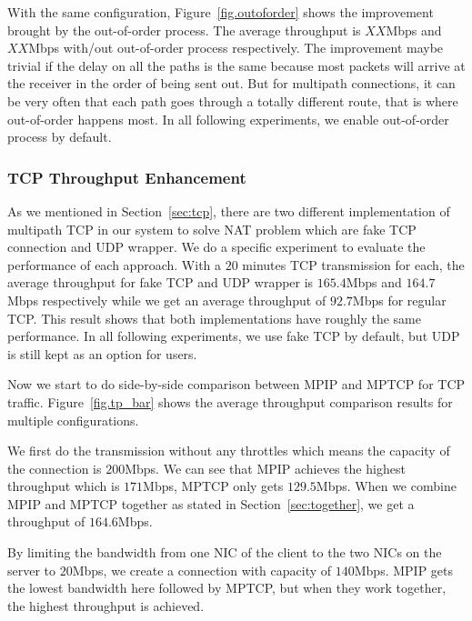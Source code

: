 With the same configuration, Figure~\ref{fig.outoforder} shows the improvement brought by the out-of-order process. The average throughput is $XX$Mbps and $XX$Mbps with/out out-of-order process respectively. The improvement maybe trivial if the delay on all the paths is the same because most packets will arrive at the receiver in the order of being sent out. But for multipath connections, it can be very often that each path goes through a totally different route, that is where out-of-order happens most. In all following experiments, we enable out-of-order process by default.

\subsubsection{TCP Throughput Enhancement}
\label{sec:tcptp}

As we mentioned in Section~\ref{sec:tcp}, there are two different implementation of multipath TCP in our system to solve NAT problem which are fake TCP connection and UDP wrapper. We do a specific experiment to evaluate the performance of each approach. With a $20$ minutes TCP transmission for each, the average throughput for fake TCP and UDP wrapper is $165.4$Mbps and $164.7$Mbps respectively while we get an average throughput of $92.7$Mbps for regular TCP. This result shows that both implementations have roughly the same performance. In all following experiments, we use fake TCP by default, but UDP is still kept as an option for users.


Now we start to do side-by-side comparison between MPIP and MPTCP for TCP traffic. Figure~\ref{fig.tp_bar} shows the average throughput comparison results for multiple configurations. 

We first do the transmission without any throttles which means the capacity of the connection is $200$Mbps. We can see that MPIP achieves the highest throughput which is $171$Mbps, MPTCP only gets $129.5$Mbps. When we combine MPIP and MPTCP together as stated in Section~\ref{sec:together}, we get a throughput of $164.6$Mbps.


By limiting the bandwidth from one NIC of the client to the two NICs on the server to $20$Mbps, we create a connection with capacity of $140$Mbps. MPIP gets the lowest bandwidth here followed by MPTCP, but when they work together, the highest throughput is achieved.

